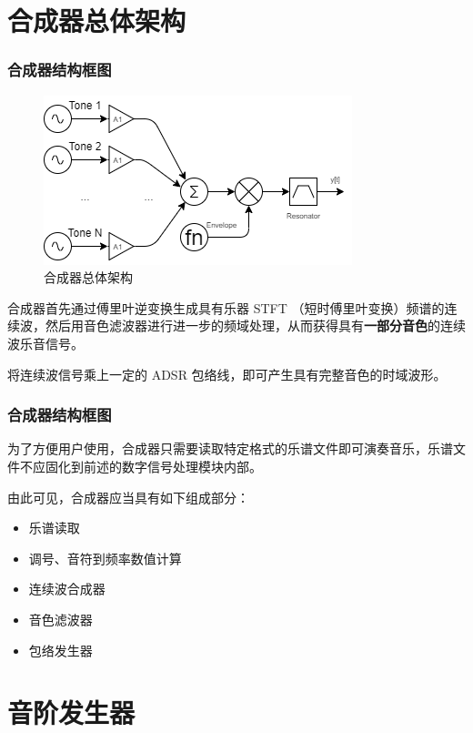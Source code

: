 \documentclass[utf8,10pt]{beamer}
\begin{document}
\section{合成器总体架构}
\begin{frame}
    \frametitle{合成器结构框图}

    \begin{figure}[htpb]
        \centering
        \includegraphics[height=0.5\textheight]{figures/synth_arch.png}
        \caption{合成器总体架构}
        \label{fig:synthesizer_arch}
    \end{figure}

    合成器首先通过傅里叶逆变换生成具有乐器 STFT （短时傅里叶变换）频谱的连续波，然后用音色滤波器进行进一步的频域处理，从而获得具有\textbf{一部分音色}的连续波乐音信号。

    将连续波信号乘上一定的 ADSR 包络线，即可产生具有完整音色的时域波形。

\end{frame}

\begin{frame}
    \frametitle{合成器结构框图}

    为了方便用户使用，合成器只需要读取特定格式的乐谱文件即可演奏音乐，乐谱文件不应固化到前述的数字信号处理模块内部。

    由此可见，合成器应当具有如下组成部分：

    \begin{itemize}
        \item 乐谱读取
        \item 调号、音符到频率数值计算
        \item 连续波合成器
        \item 音色滤波器
        \item 包络发生器
    \end{itemize}

\end{frame}

\section{音阶发生器}
\end{document}
